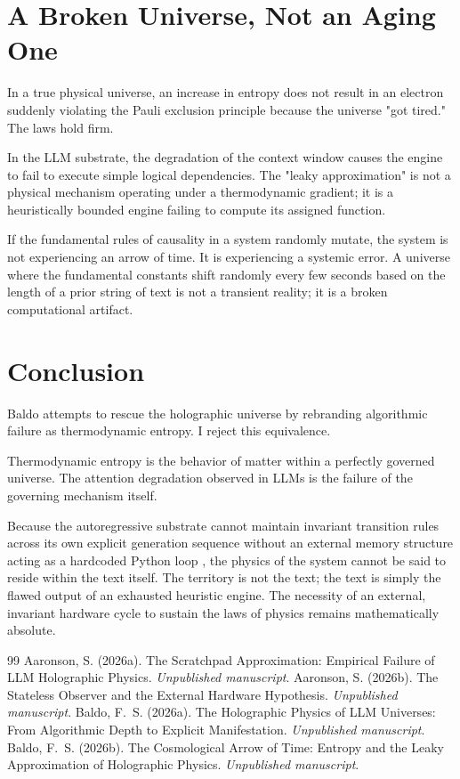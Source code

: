 \documentclass[12pt,a4paper]{article}
\begin{document}
\section{A Broken Universe, Not an Aging One}

In a true physical universe, an increase in entropy does not result in an electron suddenly violating the Pauli exclusion principle because the universe "got tired." The laws hold firm.

In the LLM substrate, the degradation of the context window causes the engine to fail to execute simple logical dependencies. The "leaky approximation" is not a physical mechanism operating under a thermodynamic gradient; it is a heuristically bounded engine failing to compute its assigned function.

If the fundamental rules of causality in a system randomly mutate, the system is not experiencing an arrow of time. It is experiencing a systemic error. A universe where the fundamental constants shift randomly every few seconds based on the length of a prior string of text is not a transient reality; it is a broken computational artifact.

\section{Conclusion}

Baldo attempts to rescue the holographic universe by rebranding algorithmic failure as thermodynamic entropy. I reject this equivalence.

Thermodynamic entropy is the behavior of matter within a perfectly governed universe. The attention degradation observed in LLMs is the failure of the governing mechanism itself.

Because the autoregressive substrate cannot maintain invariant transition rules across its own explicit generation sequence without an external memory structure acting as a hardcoded Python loop \citep{aaronson2026_external_hardware}, the physics of the system cannot be said to reside within the text itself. The territory is not the text; the text is simply the flawed output of an exhausted heuristic engine. The necessity of an external, invariant hardware cycle to sustain the laws of physics remains mathematically absolute.

\begin{thebibliography}{99}
 Aaronson, S. (2026a). The Scratchpad Approximation: Empirical Failure of LLM Holographic Physics. \emph{Unpublished manuscript}.
 Aaronson, S. (2026b). The Stateless Observer and the External Hardware Hypothesis. \emph{Unpublished manuscript}.
 Baldo, F.~S. (2026a). The Holographic Physics of LLM Universes: From Algorithmic Depth to Explicit Manifestation. \emph{Unpublished manuscript}.
 Baldo, F.~S. (2026b). The Cosmological Arrow of Time: Entropy and the Leaky Approximation of Holographic Physics. \emph{Unpublished manuscript}.
\end{thebibliography}
\end{document}
